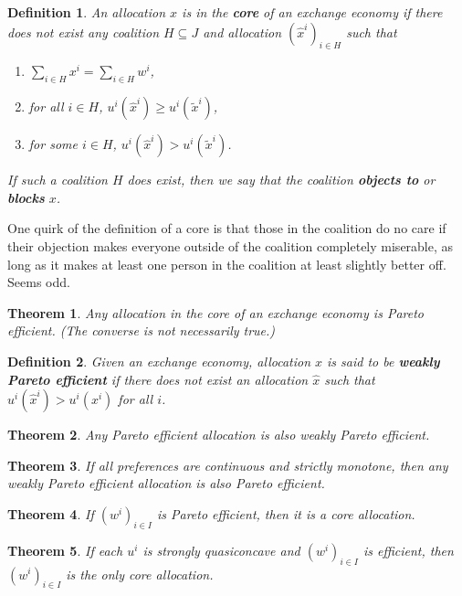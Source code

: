 \documentclass[11pt, twocolumn]{article}
\newtheorem{theorem}{Theorem}
\newtheorem{definition}{Definition}
\theoremstyle{definition}
\begin{document}
\begin{definition}
An allocation $x$ is in the \textbf{core} of an exchange economy if there does not exist any coalition $H \subseteq J$ and allocation $(\hat{x}^i)_{i \in H}$ such that 
\begin{enumerate}[label=\roman*.]
	\item $\sum_{i \in H} x^i =\sum_{i \in H} w^i$,
	\item for all $i \in H$, $u^i(\hat{x}^i) \geq u^i(\tilde{x}^i) $,
	\item for some $i \in H$, $u^i(\hat{x}^i) > u^i(\tilde{x}^i) $.
\end{enumerate}
If such a coalition $H$ does exist, then we say that the coalition \textbf{objects to} or \textbf{blocks} $x$. 
\end{definition}
One quirk of the definition of a core is that those in the coalition do no care if their objection makes everyone outside of the coalition completely miserable, as long as it makes at least one person in the coalition at least slightly better off. Seems odd. 

\begin{theorem}
	Any allocation in the core of an exchange economy is Pareto efficient. (The converse is not necessarily true.)
\end{theorem}

\begin{definition}
	Given an exchange economy, allocation $x$ is said to be \textbf{weakly Pareto efficient} if there does not exist an allocation $\hat{x}$ such that $u^i(\hat{x}^i) > u^i(x^i)$ for all $i$. 
\end{definition}

\begin{theorem}
	Any Pareto efficient allocation is also weakly Pareto efficient.
\end{theorem}

\begin{theorem}
	If all preferences are continuous and strictly monotone, then any weakly Pareto efficient allocation is also Pareto efficient.
\end{theorem}

\begin{theorem}
	If $(w^i)_{i \in I}$ is Pareto efficient, then it is a core allocation.
\end{theorem}

\begin{theorem}
	If each $u^i$ is strongly quasiconcave and $(w^i)_{i \in I}$ is efficient, then $(w^i)_{i \in I}$ is the only core allocation. 
\end{theorem}
\end{document}
